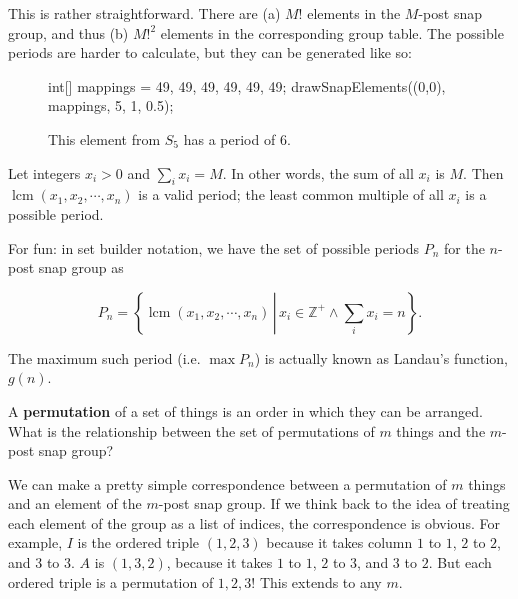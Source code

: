 \documentclass[../gatm_answers.tex]{subfiles}
\begin{document}
\noindent This is rather straightforward. There are (a) $M!$ elements in the $M$-post snap group, and thus (b) $M!^2$ elements in the corresponding group table. The possible periods are harder to calculate, but they can be generated like so:

\begin{figure}[h]
	\begin{center}
		\begin{minipage}[b]{\textwidth}
			\centering
			\begin{asy}[width=0.2\textwidth]
				int[] mappings = {49, 49, 49, 49, 49, 49};
				drawSnapElements((0,0), mappings, 5, 1, 0.5);
			\end{asy}
		\end{minipage}
	\end{center}
	\vspace*{-2\baselineskip}
	\begin{center}
		\begin{minipage}[t]{\textwidth}
			\caption{This element from $S_5$ has a period of $6$.}
			\label{fig:period_6_elem}
		\end{minipage}
	\end{center}
	\vspace*{-2\baselineskip}
\end{figure}

\noindent Let integers $x_i>0$ and $\displaystyle \sum_i x_i = M$. In other words, the sum of all $x_i$ is $M$. Then $\operatorname{lcm} (x_1, x_2, \cdots, x_n)$ is a valid period; the least common multiple of all $x_i$ is a possible period.

For fun: in set builder notation, we have the set of possible periods $P_n$ for the $n$-post snap group as

$$P_n=\left\{\operatorname{lcm} (x_1, x_2, \cdots, x_n)\, \left|\,x_i\in\mathbb{Z}^+ \land \sum_i x_i=n\right.\right\}.$$

\noindent The maximum such period (i.e. $\max P_n$) is actually known as Landau's function, $g(n)$.

\begin{outer_problem}
\item A \textbf{permutation} of a set of things is an order in which they can be arranged. What is the relationship between the set of permutations of $m$ things and the $m$-post snap group?
\end{outer_problem}

\noindent We can make a pretty simple correspondence between a permutation of $m$ things and an element of the $m$-post snap group. If we think back to the idea of treating each element of the group as a list of indices, the correspondence is obvious. For example, $I$ is the ordered triple $(1,2,3)$ because it takes column $1$ to $1$, $2$ to $2$, and $3$ to $3$. $A$ is $(1,3,2)$, because it takes $1$ to $1$, $2$ to $3$, and $3$ to $2$. But each ordered triple is a permutation of ${1,2,3}$! This extends to any $m$.
\end{document}
